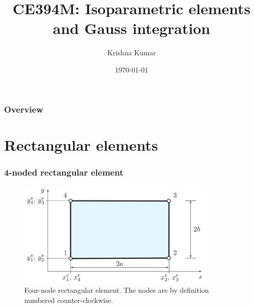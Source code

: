 \documentclass[notes]{beamer}
\title[CE394M: isoparametric - gauss integration]{CE394M: Isoparametric elements and Gauss integration}
\author{Krishna Kumar} %
\institute[UT Austin] %
{
University of Texas at Austin \\
\medskip
\textit{
  \url{krishnak@utexas.edu}} %
}
\date{\today} %
\begin{document}
\begin{frame}
\titlepage %
\end{frame}

\begin{frame}
 \frametitle{Overview}
 \tableofcontents
\end{frame}

\section{Rectangular elements}
\begin{frame}
\frametitle{4-noded rectangular element}
\begin{figure}[ht]
	\centering
	\includegraphics[width=0.85\textwidth]{figs/four-noded-quadrilateral.png}
	\caption*{Four-node rectangular element. The nodes are by definition numbered counter-clockwise.}
\end{figure}
\end{frame}
\end{document}
